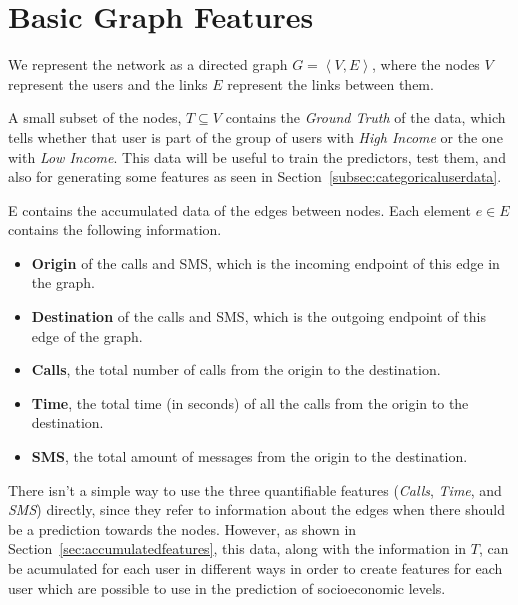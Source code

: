 \section{Basic Graph Features}

We represent the network as a directed graph $G = \left< V, E \right>$, where the nodes $V$ represent the users and the links $E$ represent the links between them.

A small subset of the nodes, $T \subseteq V$ contains the \emph{Ground Truth} of the data, which tells whether that user is part of the group of users with \emph{High Income} or the one with \emph{Low Income}. This data will be useful to train the predictors, test them, and also for generating some features as seen in Section~\ref{subsec:categoricaluserdata}.

E contains the accumulated data of the edges between nodes. Each element $e \in E$ contains the following information.

\begin{itemize}
	\item \textbf{Origin} of the calls and SMS, which is the incoming endpoint of this edge in the graph.
	\item \textbf{Destination} of the calls and SMS, which is the outgoing endpoint of this edge of the graph.
	\item \textbf{Calls}, the total number of calls from the origin to the destination.
	\item \textbf{Time}, the total time (in seconds) of all the calls from the origin to the destination.
	\item \textbf{SMS}, the total amount of messages from the origin to the destination.
\end{itemize}

There isn't a simple way to use the three quantifiable features (\emph{Calls}, \emph{Time}, and \emph{SMS}) directly, since they refer to information about the edges when there should be a prediction towards the nodes. However, as shown in Section~\ref{sec:accumulatedfeatures}, this data, along with the information in $T$, can be acumulated for each user in different ways in order to create features for each user which are possible to use in the prediction of socioeconomic levels.
